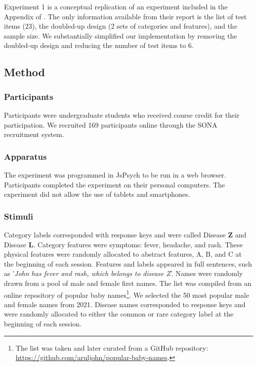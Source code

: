 \documentclass[10pt,letterpaper]{article}
\begin{document}
Experiment 1 is a conceptual replication of an experiment included in the Appendix of .
The only information available from their report is the list of test items (23), the doubled-up design (2 sets of categories and features), and the sample size.
We substantially simplified our implementation by removing the doubled-up design and reducing the number of test items to 6.

\subsection{Method}

\subsubsection{Participants}

Participants were undergraduate students who received course credit for their participation.
We recruited 169 participants online through the SONA recruitment system.

\subsubsection{Apparatus}

The experiment was programmed in JsPsych \cite{deleeuw2015JsPsych} to be run in a web browser.
Participants completed the experiment on their personal computers.
The experiment did not allow the use of tablets and smartphones.

\subsubsection{Stimuli}

Category labels corresponded with response keys and were called Disease \textbf{Z} and Disease \textbf{L}.
Category features were symptoms: fever, headache, and rash.
These physical features were randomly allocated to abstract features, A, B, and C at the beginning of each session.
Features and labels appeared in full sentences, such as '\textit{John has fever and rash, which belongs to disease Z}'.
Names were randomly drawn from a pool of male and female first names.
The list was compiled from an online repository of popular baby names\footnote{The list was taken and later curated from a GitHub repository: \href{https://github.com/aruljohn/popular-baby-names}{https://github.com/aruljohn/popular-baby-names}.}.
We selected the 50 most popular male and female names from 2021.
Disease names corresponded to response keys and were randomly allocated to either the common or rare category label at the beginning of each session.
\end{document}
